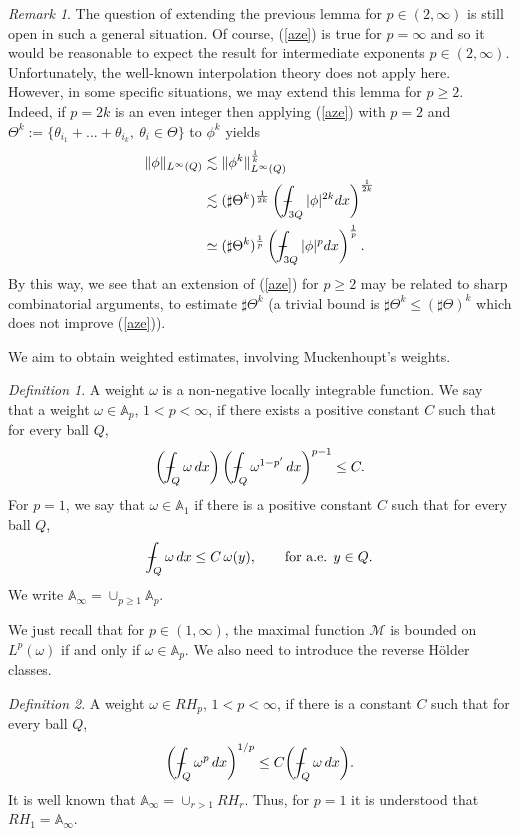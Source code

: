 \documentclass[11pt]{amsart}
\theoremstyle{remark}
\newtheorem{dfn}{Definition}[section]
\newtheorem{remark}{Remark}[section]
\newcommand{\M}{{\mathcal M}}
\def\Xint#1{\mathchoice
   {\XXint\displaystyle\textstyle{#1}}%
   {\XXint\textstyle\scriptstyle{#1}}%
   {\XXint\scriptstyle\scriptscriptstyle{#1}}%
   {\XXint\scriptscriptstyle\scriptscriptstyle{#1}}%
   \!\int}
\def\XXint#1#2#3{{\setbox0=\hbox{$#1{#2#3}{\int}$}
     \vcenter{\hbox{$#2#3$}}\kern-.5\wd0}}
\def\aver#1{\Xint-_{#1}}
\begin{document}
\begin{remark} \label{rem:lem} The question of extending the previous lemma for $p\in(2,\infty)$ is still open in such a general situation. Of course, (\ref{aze}) is true for $p=\infty$ and so it would be reasonable to expect the result for intermediate exponents $p \in(2,\infty)$. Unfortunately, the well-known interpolation theory does not apply here. \\
However, in some specific situations, we may extend this lemma for $p\geq 2$. Indeed, if $p=2k$ is an even integer then applying (\ref{aze}) with $p=2$ and $\Theta^k:=\{\theta_{i_1}+...+\theta_{i_k},\ \theta_i\in \Theta\}$ to $\phi^k$ yields
\begin{align*}
 \|\phi \|_{L^\infty(Q)} & \lesssim  \|\phi^k  \|_{L^\infty(Q)}^{\frac{1}{k}}  \\
 &  \lesssim (\sharp \Theta^k )^{\frac{1}{2k}} \left(\aver{3Q} |\phi|^{2k} dx \right)^{\frac{1}{2k}}  \\
 & \simeq (\sharp \Theta^k )^{\frac{1}{p}} \left(\aver{3Q} |\phi|^{p} dx \right)^{\frac{1}{p}}.  
\end{align*}
By this way, we see that an extension of (\ref{aze}) for $p\geq 2$ may be related to sharp combinatorial arguments, to estimate $\sharp \Theta^k$ (a trivial bound is $\sharp \Theta^k \leq (\sharp \Theta)^{k}$ which does not improve (\ref{aze})). 
\end{remark}


We aim to obtain weighted estimates, involving Muckenhoupt's weights. 

\begin{dfn} \label{def:1} A weight $\omega$ is a non-negative locally integrable function.
We say that a weight $\omega\in {\mathbb A}_p$, $1<p<\infty$, if there exists a positive constant $C$ such that for every ball $Q$,
$$\bigg(\aver{Q} \omega\,dx\bigg)\, \bigg(\aver{Q} \omega^{1-p'}\,dx\bigg)^{p-1}\le C.
$$
For $p=1$, we say that $\omega\in {\mathbb A}_1$ if there is a positive constant $C$ such
that for every ball $Q$,
$$
\aver{Q} \omega \,dx
\le
C\, \omega (y),
\qquad \mbox{for a.e. }y\in Q.
$$
We write ${\mathbb A}_\infty=\cup_{p\ge 1} {\mathbb A}_p$.
\end{dfn}

We just recall that for $p\in(1,\infty)$, the maximal function $\M$ is bounded on $L^p(\omega)$ if and only if $\omega \in {\mathbb A}_p$.
We also need to introduce the reverse H\"older classes. 

\begin{dfn} \label{def:2} A weight $\omega \in RH_p$, $1<p<\infty$, if there is a constant $C$ such that for every ball $Q$,
$$
\bigg( \aver{Q} \omega^p\,dx \bigg)^{1/p} \leq C \bigg(\aver{Q} \omega\,dx\bigg).
$$
It is well known that ${\mathbb A}_\infty=\cup_{r>1} RH_r$. Thus, for $p=1$ it is understood that $RH_1={\mathbb A}_\infty$.
\end{dfn}
\end{document}
